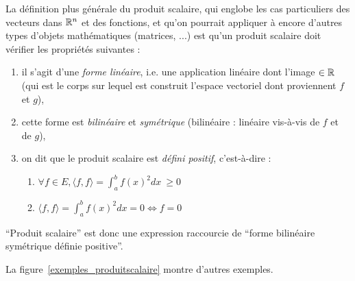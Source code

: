La définition plus générale du produit scalaire, qui englobe les cas particuliers des vecteurs dans $\mathbb{R}^n$ et des fonctions, et qu'on pourrait appliquer à encore d'autres types d'objets mathématiques (matrices, ...) est qu'un produit scalaire doit vérifier les propriétés suivantes :

\begin{enumerate}
\item il s'agit d'une \emph{forme linéaire}, i.e. une application
  linéaire dont l'image $\in \mathbb{R}$ (qui est le corps sur lequel est
  construit l'espace vectoriel dont proviennent $f$ et $g$),
\item cette forme est \emph{bilinéaire} et \emph{symétrique}
  (bilinéaire : linéaire vis-à-vis de $f$ et de $g$),
\item on dit que le produit scalaire est \emph{défini positif},
  c'est-à-dire :
\begin{enumerate}
\item $\forall f \in E, \langle f, f \rangle=\int_a^bf(x)^2 dx~\geq 0 $ 
\item $\langle f, f \rangle=\int_a^bf(x)^2 dx=0 \Longleftrightarrow f=0$
\end{enumerate}
\end{enumerate}
``Produit scalaire'' est donc une expression raccourcie de ``forme
bilinéaire symétrique définie positive''. 

La figure~\ref{exemples_produitscalaire} montre d'autres exemples.

